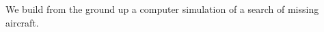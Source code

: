 \documentclass[12pt, letterpaper]{article}  %
\theoremstyle{definition}
\theoremstyle{remark}
\theoremstyle{plain}
\begin{document}
\ \vspace{0.3in} %

\begin{center}
\Large  %
\end{center}

\ \normalsize \\



We build from the ground up a computer simulation of a search of missing aircraft. 








\end{document}
